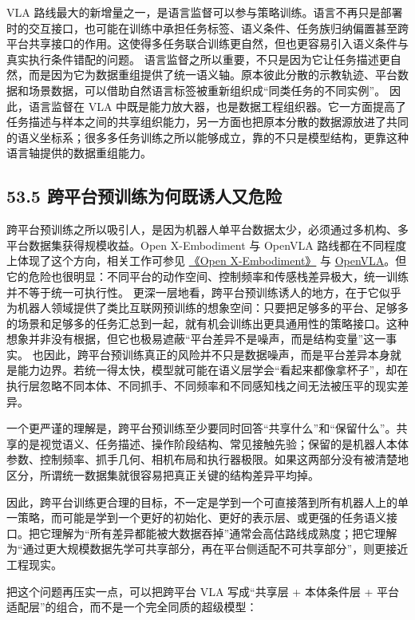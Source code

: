 VLA 路线最大的新增量之一，是语言监督可以参与策略训练。语言不再只是部署时的交互接口，也可能在训练中承担任务标签、语义条件、任务族归纳偏置甚至跨平台共享接口的作用。这使得多任务联合训练更自然，但也更容易引入语义条件与真实执行条件错配的问题。 语言监督之所以重要，不只是因为它让任务描述更自然，而是因为它为数据重组提供了统一语义轴。原本彼此分散的示教轨迹、平台数据和场景数据，可以借助自然语言标签被重新组织成“同类任务的不同实例”。 因此，语言监督在 VLA 中既是能力放大器，也是数据工程组织器。它一方面提高了任务描述与样本之间的共享组织能力，另一方面也把原本分散的数据源放进了共同的语义坐标系；很多多任务训练之所以能够成立，靠的不只是模型结构，更靠这种语言轴提供的数据重组能力。

\subsection*{53.5 跨平台预训练为何既诱人又危险}


跨平台预训练之所以吸引人，是因为机器人单平台数据太少，必须通过多机构、多平台数据集获得规模收益。Open X-Embodiment 与 OpenVLA 路线都在不同程度上体现了这个方向，相关工作可参见 \href{https://arxiv.org/abs/2310.08864}{《Open X-Embodiment》} 与 \href{https://arxiv.org/abs/2406.09246}{OpenVLA}。但它的危险也很明显：不同平台的动作空间、控制频率和传感栈差异极大，统一训练并不等于统一可执行性。 更深一层地看，跨平台预训练诱人的地方，在于它似乎为机器人领域提供了类比互联网预训练的想象空间：只要把足够多的平台、足够多的场景和足够多的任务汇总到一起，就有机会训练出更具通用性的策略接口。这种想象并非没有根据，但它也极易遮蔽“平台差异不是噪声，而是结构变量”这一事实。 也因此，跨平台预训练真正的风险并不只是数据噪声，而是平台差异本身就是能力边界。若统一得太快，模型就可能在语义层学会“看起来都像拿杯子”，却在执行层忽略不同本体、不同抓手、不同频率和不同感知栈之间无法被压平的现实差异。

一个更严谨的理解是，跨平台预训练至少要同时回答“共享什么”和“保留什么”。共享的是视觉语义、任务描述、操作阶段结构、常见接触先验；保留的是机器人本体参数、控制频率、抓手几何、相机布局和执行器极限。如果这两部分没有被清楚地区分，所谓统一数据集就很容易把真正关键的结构差异平均掉。

因此，跨平台训练更合理的目标，不一定是学到一个可直接落到所有机器人上的单一策略，而可能是学到一个更好的初始化、更好的表示层、或更强的任务语义接口。把它理解为“所有差异都能被大数据吞掉”通常会高估路线成熟度；把它理解为“通过更大规模数据先学可共享部分，再在平台侧适配不可共享部分”，则更接近工程现实。

把这个问题再压实一点，可以把跨平台 VLA 写成“共享层 + 本体条件层 + 平台适配层”的组合，而不是一个完全同质的超级模型：

